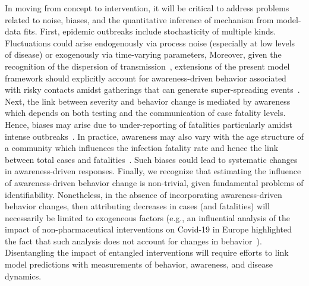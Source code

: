 In moving from concept to intervention,
it will be critical to address problems related to noise,
biases, and
the quantitative inference of mechanism from model-data fits.
First, epidemic outbreaks include stochasticity
of multiple kinds.  Fluctuations could arise endogenously via process noise (especially at low levels of disease) or exogenously via time-varying parameters, Moreover, given the recognition of the dispersion of
transmission~\citep{adam_2020clustering,althouse_2020stochasticity,lau_pnas2020,liu_lancet2020}, extensions of the present model framework should 
explicitly account for awareness-driven behavior associated with
risky contacts amidst gatherings that can generate 
super-spreading events~\citep{frieden_eid2020,kain_2020}.
Next, the link between severity and behavior change is mediated
by awareness which depends on both testing and the communication of
case fatality levels. Hence, biases may arise due to
under-reporting of fatalities particularly
amidst intense outbreaks~\citep{weinberger_2020estimation}.
In practice, awareness may also vary with the age structure of a community
which influences the infection fatality rate
and hence the link between total cases and fatalities~\citep{meyerowitz_2020}. 
Such biases could lead to systematic changes in awareness-driven responses.
Finally, we recognize that estimating
the influence of awareness-driven behavior change is non-trivial,
given fundamental problems of identifiability.  Nonetheless,
in the absence of incorporating awareness-driven behavior changes,
then attributing decreases in cases (and fatalities) will
necessarily be limited to exogeneous factors (e.g., an influential
analysis of the impact of non-pharmaceutical interventions on Covid-19 in Europe highlighted the fact that such analysis does not account for changes in behavior~\citep{flaxman_2020}).
Disentangling the impact of entangled interventions
will require efforts to link model predictions
with measurements of behavior, awareness, and disease dynamics.

